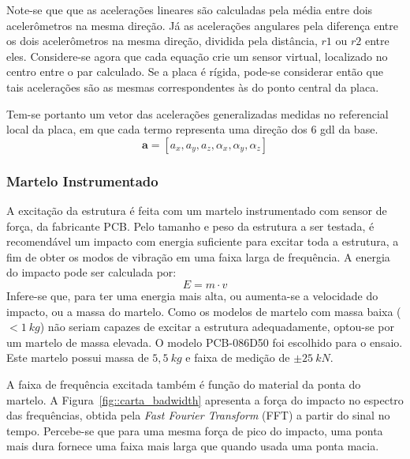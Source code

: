 Note-se que que as acelerações lineares são calculadas pela média entre dois
acelerômetros na mesma direção.
Já as acelerações angulares pela diferença entre os dois acelerômetros na mesma
direção, dividida pela distância, $r1$ ou $r2$ entre eles. Considere-se agora
que cada equação crie um sensor virtual, localizado no centro entre o par
calculado. Se a placa é rígida, pode-se considerar então que tais acelerações
são as mesmas correspondentes às do ponto central
da placa.

Tem-se portanto um vetor das acelerações generalizadas medidas no referencial
local da placa, em que cada termo representa uma direção dos 6 gdl da base.
%
\begin{equation}
	\mathbf{a} = \left[ a_x, a_y, a_z, \alpha_x, \alpha_y, \alpha_z \right]
\end{equation}
%

\subsubsection{Martelo Instrumentado}

A excitação da estrutura é feita com um martelo instrumentado com sensor de
força, da fabricante PCB. Pelo tamanho e peso da estrutura a ser testada, é
recomendável um impacto com energia suficiente para excitar toda a estrutura, a
fim de obter os modos de vibração em uma faixa larga de frequência. A energia do
impacto pode ser calculada por:
%
\begin{equation}
	E = m \cdot v
\end{equation}
%
Infere-se que, para ter uma energia mais alta, ou aumenta-se a velocidade do
impacto, ou a massa do martelo. Como os modelos de martelo com massa baixa
($<1~kg$) não seriam capazes de excitar a estrutura adequadamente, optou-se por
um martelo de massa elevada. O modelo PCB-086D50 foi escolhido para o ensaio.
Este martelo possui massa de $5,5~kg$ e faixa de medição de $\pm 25~kN$.

A faixa de frequência excitada também é função do material da ponta do martelo.
A Figura~\ref{fig::carta_badwidth} apresenta a força do impacto no espectro das
frequências, obtida pela \textit{Fast Fourier Transform} (FFT) a partir do sinal
no tempo.
Percebe-se que para uma mesma força de pico do impacto, uma ponta mais dura
fornece uma faixa mais larga que quando usada uma ponta macia.

